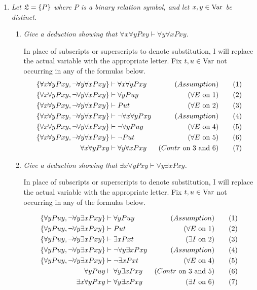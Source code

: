 \documentclass[10pt]{article}
\begin{document}
\begin{enumerate}
\item \emph{Let $\mathfrak{L} = \left\{ P \right\}$ where $P$ is a binary relation symbol, and let $x,y \in \operatorname{Var}$ be distinct.}
\begin{enumerate}
\item \emph{Give a deduction showing that $\forall x \forall y Pxy \vdash \forall y \forall x Pxy$.}

In place of subscripts or superscripts to denote substitution, I will replace the actual variable with the appropriate letter.  Fix $t,u \in \operatorname{Var}$ not occurring in any of the formulas below.
\begin{align*}
\left\{ \forall x \forall y Pxy, \neg \forall y \forall x Pxy \right\} &\vdash \forall x \forall y Pxy & (Assumption) & \tag{1} \\
\left\{ \forall x \forall y Pxy, \neg \forall y \forall x Pxy \right\} &\vdash \forall y Puy & (\forall E \mbox{ on } 1) & \tag{2} \\
\left\{ \forall x \forall y Pxy, \neg \forall y \forall x Pxy \right\} &\vdash Put & (\forall E \mbox{ on } 2) & \tag{3} \\
\left\{ \forall x \forall y Pxy, \neg \forall y \forall x Pxy \right\} &\vdash \neg \forall x \forall y Pxy & (Assumption) & \tag{4} \\
\left\{ \forall x \forall y Pxy, \neg \forall y \forall x Pxy \right\} &\vdash \neg \forall y Puy & (\forall E \mbox{ on } 4) & \tag{5} \\
\left\{ \forall x \forall y Pxy, \neg \forall y \forall x Pxy \right\} &\vdash \neg Put & (\forall E \mbox{ on } 5) & \tag{6} \\
\forall x \forall y Pxy & \vdash \forall y \forall x Pxy & (Contr \mbox{ on $3$ and $6$}) & \tag{7}
\end{align*}

\item \emph{Give a deduction showing that $\exists x \forall y Pxy \vdash \forall y \exists x Pxy$.}

In place of subscripts or superscripts to denote substitution, I will replace the actual variable with the appropriate letter.  Fix $t,u \in \operatorname{Var}$ not occurring in any of the formulas below.

\begin{align*}
\left\{ \forall y Puy, \neg \forall y \exists x Pxy \right\} & \vdash \forall y Puy & (Assumption) & \tag{1} \\
\left\{ \forall y Puy, \neg \forall y \exists x Pxy \right\} & \vdash Put & (\forall E \mbox { on $1$}) & \tag{2} \\
\left\{ \forall y Puy, \neg \forall y \exists x Pxy \right\} & \vdash \exists x Pxt & (\exists I \mbox { on $2$}) & \tag{3} \\
\left\{ \forall y Puy, \neg \forall y \exists x Pxy \right\} & \vdash \neg \forall y \exists x Pxy & (Assumption) & \tag{4} \\
\left\{ \forall y Puy, \neg \forall y \exists x Pxy \right\} & \vdash \neg \exists x Pxt & (\forall E \mbox{ on $4$}) & \tag{5} \\
\forall y Puy &\vdash \forall y \exists x Pxy & (Contr \mbox{ on $3$ and $5$}) & \tag{6} \\
\exists x \forall y Pxy &\vdash \forall y \exists x Pxy & (\exists I \mbox{ on $6$}) & \tag{7}
\end{align*}


\end{enumerate}
\end{enumerate}
\end{document}
